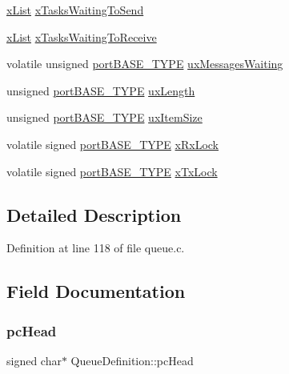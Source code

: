 \begin{DoxyCompactItemize}
\begin{tabbing}
\end{tabbing}\item 
\hyperlink{list_8h_a3cee7d8d40380f66ac73b8825b5a0fb0}{x\+List} \hyperlink{structQueueDefinition_a073ad0a31a51508395efd54599c73ee1}{x\+Tasks\+Waiting\+To\+Send}
\item 
\hyperlink{list_8h_a3cee7d8d40380f66ac73b8825b5a0fb0}{x\+List} \hyperlink{structQueueDefinition_a3f26a41f0c0d17fc4645905b309b33aa}{x\+Tasks\+Waiting\+To\+Receive}
\item 
volatile unsigned \hyperlink{portmacro_8h_a1ebe82d24d764ae4e352f7c3a9f92c01}{port\+B\+A\+S\+E\+\_\+\+T\+Y\+PE} \hyperlink{structQueueDefinition_a8e3b24b25631daa65cc8b860346013e3}{ux\+Messages\+Waiting}
\item 
unsigned \hyperlink{portmacro_8h_a1ebe82d24d764ae4e352f7c3a9f92c01}{port\+B\+A\+S\+E\+\_\+\+T\+Y\+PE} \hyperlink{structQueueDefinition_af1edbb7426dad16a57e1fc6bb475bc7e}{ux\+Length}
\item 
unsigned \hyperlink{portmacro_8h_a1ebe82d24d764ae4e352f7c3a9f92c01}{port\+B\+A\+S\+E\+\_\+\+T\+Y\+PE} \hyperlink{structQueueDefinition_ad8719a7d6da96299b7ed158a621ae7e5}{ux\+Item\+Size}
\item 
volatile signed \hyperlink{portmacro_8h_a1ebe82d24d764ae4e352f7c3a9f92c01}{port\+B\+A\+S\+E\+\_\+\+T\+Y\+PE} \hyperlink{structQueueDefinition_a55d7241c91d75f3bf4ad4032aeaaf824}{x\+Rx\+Lock}
\item 
volatile signed \hyperlink{portmacro_8h_a1ebe82d24d764ae4e352f7c3a9f92c01}{port\+B\+A\+S\+E\+\_\+\+T\+Y\+PE} \hyperlink{structQueueDefinition_a393aeeb16596b1be505014b57158c995}{x\+Tx\+Lock}
\end{DoxyCompactItemize}


\subsection{Detailed Description}


Definition at line 118 of file queue.\+c.



\subsection{Field Documentation}
\mbox{\label{structQueueDefinition_ae27bcbc6d35f837dedc62321501daa49}} 
\subsubsection{\texorpdfstring{pc\+Head}{pcHead}}
{\footnotesize\ttfamily signed char$\ast$ Queue\+Definition\+::pc\+Head}



